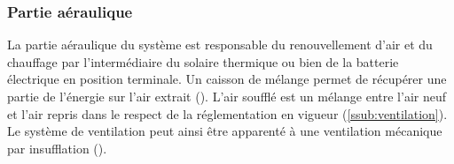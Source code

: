 \subsubsection{Partie aéraulique} %
\label{ssub:partie_aeraulique}
La partie aéraulique du système est responsable du renouvellement d’air et du chauffage
par l’intermédiaire du solaire thermique ou bien de la batterie électrique en
position terminale. Un caisson de mélange permet de récupérer une partie de l’énergie
sur l’air extrait (). L’air soufflé est un mélange entre
l’air neuf et l’air repris dans le respect de la réglementation en vigueur (\ref{ssub:ventilation}).
Le système de ventilation peut ainsi être apparenté à une ventilation mécanique par insufflation
().


